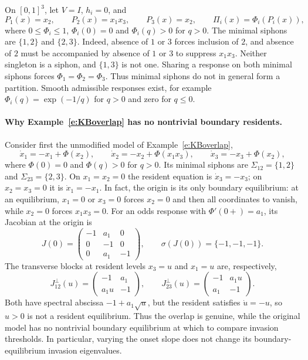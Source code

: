 On $[0,1]^3$, let $V=I$, $h_i=0$, and
\[
 P_1(x)=x_2,\qquad P_2(x)=x_1x_3,\qquad P_3(x)=x_2,
 \qquad \Pi_i(x)=\Phi_i(P_i(x)),
\]
where $0\le \Phi_i\le1$, $\Phi_i(0)=0$ and $\Phi_i(q)>0$ for $q>0$.
The minimal siphons are $\{1,2\}$ and $\{2,3\}$.
Indeed, absence of $1$ or $3$ forces inclusion of $2$, and absence
of $2$ must be accompanied by absence of $1$ or $3$ to suppress
$x_1x_3$. Neither singleton is a siphon, and $\{1,3\}$ is not one.
Sharing a response on both minimal siphons forces
$\Phi_1=\Phi_2=\Phi_3$. Thus minimal siphons do not in general form a
partition. Smooth admissible responses exist, for example
$\Phi_i(q)=\exp(-1/q)$ for $q>0$ and zero for $q\le0$.
\eeXa

\paragraph{Why Example~\ref{e:KBoverlap} has no nontrivial boundary residents.}
Consider first the unmodified model of Example~\ref{e:KBoverlap},
\[
 \dot x_1=-x_1+\Phi(x_2),\qquad
 \dot x_2=-x_2+\Phi(x_1x_3),\qquad
 \dot x_3=-x_3+\Phi(x_2),
\]
where $\Phi(0)=0$ and $\Phi(q)>0$ for $q>0$. Its minimal siphons
are $\Sigma_{12}=\{1,2\}$ and $\Sigma_{23}=\{2,3\}$.
On $x_1=x_2=0$ the resident equation is $\dot x_3=-x_3$;
on $x_2=x_3=0$ it is $\dot x_1=-x_1$.
In fact, the origin is its only boundary equilibrium: at an
equilibrium, $x_1=0$ or $x_3=0$ forces $x_2=0$ and then all
coordinates to vanish, while $x_2=0$ forces $x_1x_3=0$.
For an odds response with $\Phi'(0+)=a_1$, its Jacobian at the
origin is
\[
 J(0)=\begin{pmatrix}
 -1&a_1&0\\ 0&-1&0\\ 0&a_1&-1
 \end{pmatrix},\qquad \sigma(J(0))=\{-1,-1,-1\}.
\]
The transverse blocks at resident levels $x_3=u$ and $x_1=u$
are, respectively,
\[
 J_{12}^\perp(u)=\begin{pmatrix}-1&a_1\\a_1u&-1\end{pmatrix},
 \qquad
 J_{23}^\perp(u)=\begin{pmatrix}-1&a_1u\\a_1&-1\end{pmatrix}.
\]
Both have spectral abscissa $-1+a_1\sqrt{u}$, but the
resident satisfies $\dot u=-u$, so $u>0$ is not a resident
equilibrium. Thus the overlap is genuine, while the original
model has no nontrivial boundary equilibrium at which to
compare invasion thresholds. In particular, varying the onset
slope does not change its boundary-equilibrium invasion
eigenvalues.

